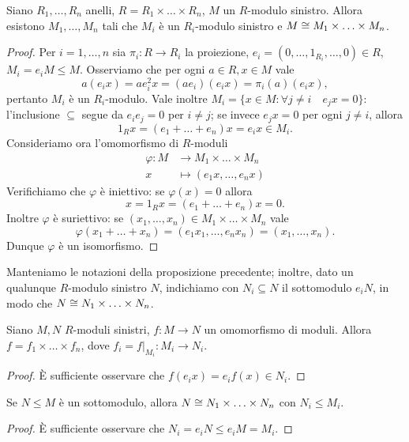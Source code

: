 \begin{proposition}
Siano $R_1,\ldots,R_n$ anelli, $R=R_1\times\ldots\times R_n$, $M$ un $R$-modulo sinistro. Allora esistono $M_1,\ldots,M_n$ tali che $M_i$ è un $R_i$-modulo sinistro e $M\cong M_1\times\ldots\times M_n$.
\end{proposition}
\begin{proof}
Per $i=1,\ldots, n$ sia $\pi_i:R\to R_i$ la proiezione, $e_i=(0,\ldots,1_{R_i},\ldots,0)\in R$, $M_i=e_iM\le M$. Osserviamo che per ogni $a\in R\comma x\in M$ vale
$$
a(e_ix)=ae_i^2x=(ae_i)(e_ix)=\pi_i(a)(e_ix),
$$
pertanto $M_i$ è un $R_i$-modulo. Vale inoltre $M_i=\{x\in M:\forall j\neq i\quad e_jx=0\}$: l'inclusione $\subseteq$ segue da $e_ie_j=0$ per $i\neq j$; se invece $e_jx=0$ per ogni $j\neq i$, allora
$$
1_Rx=(e_1+\ldots+e_n)x=e_ix\in M_i.
$$
Consideriamo ora l'omomorfismo di $R$-moduli
\begin{align*}
\varphi:M&\longrightarrow M_1\times\ldots\times M_n\\
x&\longmapsto (e_1x,\ldots,e_nx)
\end{align*}
Verifichiamo che $\varphi$ è iniettivo: se $\varphi(x)=0$ allora
$$
x=1_Rx=(e_1+\ldots+e_n)x=0.
$$
Inoltre $\varphi$ è suriettivo: se $(x_1,\ldots,x_n)\in M_1\times\ldots\times M_n$ vale
$$
\varphi(x_1+\ldots+x_n)=(e_1x_1,\ldots,e_nx_n)=(x_1,\ldots,x_n).
$$
Dunque $\varphi$ è un isomorfismo.
\end{proof}
Manteniamo le notazioni della proposizione precedente; inoltre, dato un qualunque $R$-modulo sinistro $N$, indichiamo con $N_i\subseteq N$ il sottomodulo $e_iN$, in modo che $N\cong N_1\times\ldots\times N_n$.


\begin{corollary}
Siano $M,N$ $R$-moduli sinistri, $f:M\to N$ un omomorfismo di moduli. Allora $f=f_1\times\ldots\times f_n$, dove $f_i=f|_{M_i}:M_i\to N_i$.
\end{corollary}
\begin{proof}
È sufficiente osservare che $f(e_ix)=e_if(x)\in N_i$.
\end{proof}

\begin{corollary}
Se $N\le M$ è un sottomodulo, allora $N\cong N_1\times\ldots\times N_n$ con $N_i\le M_i$.
\end{corollary}
\begin{proof}
È sufficiente osservare che $N_i=e_iN\le e_iM=M_i$. 
\end{proof}


